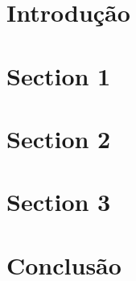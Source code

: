 \documentclass[a4paper,11pt]{article}
\begin{document}

\newpage
\tableofcontents
\thispagestyle{empty}
\newpage
\section{Introdução}
\section{Section 1}
\section{Section 2}
\section{Section 3}
\section{Conclusão}
\newpage
\nocite{ams} 
\renewcommand\refname{Referências}
%

\thispagestyle{empty}

\thispagestyle{empty}
\end{document}
